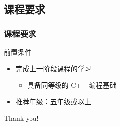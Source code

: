 \subsection{课程要求}

\begin{frame}[fragile]
    \frametitle{课程要求}

    \begin{alertblock}{前置条件}
        \begin{itemize}
            \item 完成上一阶段课程的学习

                \begin{itemize}
                    \item 具备同等级的 C++ 编程基础
                \end{itemize}

            \item 推荐年级：五年级或以上
        \end{itemize}
    \end{alertblock}
\end{frame}

\begin{frame}
    \begin{center}
        {\Huge Thank you!}
    \end{center}
\end{frame}



